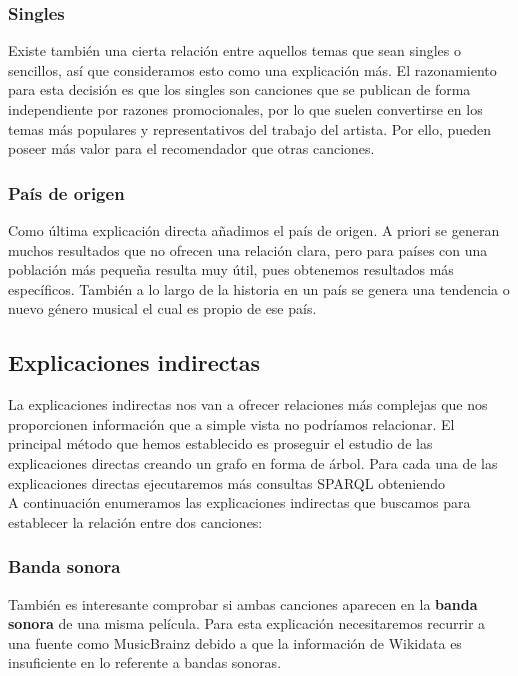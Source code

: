 \subsubsection*{Singles}

Existe también una cierta relación entre aquellos temas que sean singles o sencillos, así que consideramos esto como una explicación más. El razonamiento para esta decisión es que los singles son canciones que se publican de forma independiente por razones promocionales, por lo que suelen convertirse en los temas más populares y representativos del trabajo del artista. Por ello, pueden poseer más valor para el recomendador que otras canciones.

\subsubsection*{País de origen}

Como última explicación directa añadimos el país de origen. A priori se generan muchos resultados que no ofrecen una relación clara, pero para países con una población más pequeña resulta muy útil, pues obtenemos resultados más específicos. También a lo largo de la historia en un país se genera una tendencia o nuevo género musical el cual es propio de ese país.

\subsection{Explicaciones indirectas}

La explicaciones indirectas nos van a ofrecer relaciones más complejas que nos proporcionen información que a simple vista no podríamos relacionar.
El principal método que hemos establecido es proseguir el estudio de las explicaciones directas creando un grafo en forma de árbol.
Para cada una de las explicaciones directas ejecutaremos más consultas SPARQL obteniendo\\


A continuación enumeramos las explicaciones indirectas que buscamos para establecer la relación entre dos canciones:

\subsubsection*{Banda sonora}

También es interesante comprobar si ambas canciones aparecen en la \textbf{banda sonora} de una misma película. Para esta explicación necesitaremos recurrir a una fuente como MusicBrainz debido a que la información de Wikidata es insuficiente en lo referente a bandas sonoras.

